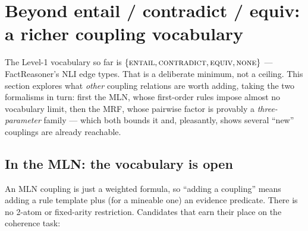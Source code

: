 \documentclass[11pt]{article}
\newcommand{\Ent}{\textsc{entail}}
\newcommand{\Con}{\textsc{contradict}}
\newcommand{\Equ}{\textsc{equiv}}
\newcommand{\None}{\textsc{none}}
\begin{document}
\section{Beyond entail / contradict / equiv: a richer coupling vocabulary}
\label{sec:couplings}

The Level-1 vocabulary so far is $\{\Ent,\Con,\Equ,\None\}$ --- FactReasoner's NLI edge
types. That is a deliberate minimum, not a ceiling. This section explores what \emph{other}
coupling relations are worth adding, taking the two formalisms in turn: first the MLN, whose
first-order rules impose almost no vocabulary limit, then the MRF, whose pairwise factor is
provably a \emph{three-parameter} family --- which both bounds it and, pleasantly, shows
several ``new'' couplings are already reachable.

\subsection{In the MLN: the vocabulary is open}
\label{sec:couplings-mln}
An MLN coupling is just a weighted formula, so ``adding a coupling'' means adding a rule
template plus (for a mineable one) an evidence predicate. There is no 2-atom or fixed-arity
restriction. Candidates that earn their place on the coherence task:
\end{document}

